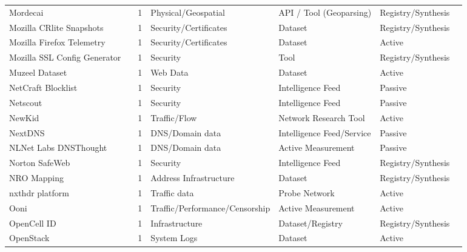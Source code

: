 \begin{table}[h!]
\begin{tabular}{lllllll}
Mordecai & \cite{mordecai} & 1 & Physical/Geospatial & API / Tool (Geoparsing) & Registry/Synthesis & \cite{10.1145/3618257.3624816} \\
Mozilla CRlite Snapshots & \cite{crlite} & 1 & Security/Certificates & Dataset & Registry/Synthesis & \cite{10.1145/3777912.3839820} \\
Mozilla Firefox Telemetry & \cite{mozillatelemetry} & 1 & Security/Certificates & Dataset & Active & \cite{10.1145/3777912.3839820} \\
Mozilla SSL Config Generator & \cite{sslgenerator} & 1 & Security & Tool & Registry/Synthesis & \cite{10.1007/978-3-031-28486-1_6} \\
Muzeel Dataset & \cite{10.1145/3517745.3561427} & 1 & Web Data & Dataset & Active & \cite{10.1145/3777912.3839817} \\
NetCraft Blocklist & \cite{netcraft} & 1 & Security & Intelligence Feed & Passive & \cite{10.1007/978-3-030-98785-5_1} \\
Netscout & \cite{netscout} & 1 & Security & Intelligence Feed & Passive & \cite{10.1145/3646547.3688451} \\
NewKid & \cite{10.1007/978-3-030-72582-2_16} & 1 & Traffic/Flow & Network Research Tool & Active & \cite{10.1145/3646547.3688451} \\
NextDNS & \cite{nextdns} & 1 & DNS/Domain data & Intelligence Feed/Service & Passive & \cite{10.1145/3730567.3764491} \\
NLNet Labs DNSThought & \cite{nlnet} & 1 & DNS/Domain data & Active Measurement & Passive & \cite{10.1007/978-3-031-28486-1_21} \\
Norton SafeWeb & \cite{norton} & 1 & Security & Intelligence Feed & Registry/Synthesis & \cite{10.1145/3777912.3839787} \\
NRO Mapping & \cite{nro} & 1 & Address Infrastructure & Dataset & Registry/Synthesis & \cite{10.1145/3777912.3809139} \\
nxthdr platform & \cite{nxthdr} & 1 & Traffic data & Probe Network & Active & \cite{10.1145/3777912.3839828} \\
Ooni & \cite{ooni} & 1 & Traffic/Performance/Censorship & Active Measurement & Active & \cite{10.1007/978-3-030-98785-5_23} \\
OpenCell ID & \cite{opencellid} & 1 & Infrastructure & Dataset/Registry & Registry/Synthesis & \cite{10.1007/978-3-030-72582-2_15} \\
OpenStack & \cite{10.1145/3133956.3134015} & 1 & System Logs & Dataset & Active & \cite{10.1007/978-3-032-18268-5_16} \\

\end{tabular}
\end{table}
